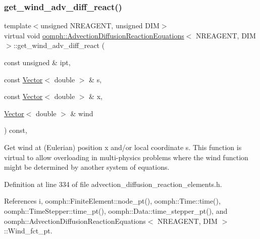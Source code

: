 \subsubsection{\texorpdfstring{get\+\_\+wind\+\_\+adv\+\_\+diff\+\_\+react()}{get\_wind\_adv\_diff\_react()}}
{\footnotesize\ttfamily template$<$unsigned N\+R\+E\+A\+G\+E\+NT, unsigned D\+IM$>$ \\
virtual void \hyperlink{classoomph_1_1AdvectionDiffusionReactionEquations}{oomph\+::\+Advection\+Diffusion\+Reaction\+Equations}$<$ N\+R\+E\+A\+G\+E\+NT, D\+IM $>$\+::get\+\_\+wind\+\_\+adv\+\_\+diff\+\_\+react (\begin{DoxyParamCaption}\item[{const unsigned \&}]{ipt,  }\item[{const \hyperlink{classoomph_1_1Vector}{Vector}$<$ double $>$ \&}]{s,  }\item[{const \hyperlink{classoomph_1_1Vector}{Vector}$<$ double $>$ \&}]{x,  }\item[{\hyperlink{classoomph_1_1Vector}{Vector}$<$ double $>$ \&}]{wind }\end{DoxyParamCaption}) const\hspace{0.3cm}{\ttfamily [inline]}, {\ttfamily [virtual]}}



Get wind at (Eulerian) position x and/or local coordinate s. This function is virtual to allow overloading in multi-\/physics problems where the wind function might be determined by another system of equations. 



Definition at line 334 of file advection\+\_\+diffusion\+\_\+reaction\+\_\+elements.\+h.



References i, oomph\+::\+Finite\+Element\+::node\+\_\+pt(), oomph\+::\+Time\+::time(), oomph\+::\+Time\+Stepper\+::time\+\_\+pt(), oomph\+::\+Data\+::time\+\_\+stepper\+\_\+pt(), and oomph\+::\+Advection\+Diffusion\+Reaction\+Equations$<$ N\+R\+E\+A\+G\+E\+N\+T, D\+I\+M $>$\+::\+Wind\+\_\+fct\+\_\+pt.

\mbox{\label{classoomph_1_1AdvectionDiffusionReactionEquations_a75c644617090bfec77366b455bb5e91a}} 
